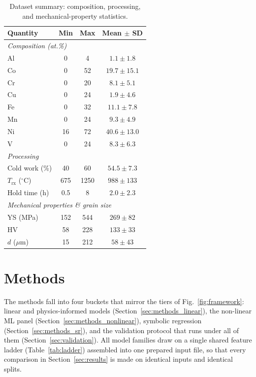 \documentclass[5p,times,twocolumn]{elsarticle}
\begin{document}
\begin{table}[t]
\centering
\caption{Dataset summary: composition, processing, and mechanical-property statistics.}
\label{tab:dataset}
\small
\begin{tabular}{lccc}
\toprule
Quantity & Min & Max & Mean $\pm$ SD \\
\midrule
\multicolumn{4}{l}{\textit{Composition (at.\%)}} \\
Al & 0 & 4 & $1.1 \pm 1.8$ \\
Co & 0 & 52 & $19.7 \pm 15.1$ \\
Cr & 0 & 20 & $8.1 \pm 5.1$ \\
Cu & 0 & 24 & $1.9 \pm 4.6$ \\
Fe & 0 & 32 & $11.1 \pm 7.8$ \\
Mn & 0 & 24 & $9.3 \pm 4.9$ \\
Ni & 16 & 72 & $40.6 \pm 13.0$ \\
V  & 0 & 24 & $8.3 \pm 6.3$ \\
\midrule
\multicolumn{4}{l}{\textit{Processing}} \\
Cold work (\%)              & 40 & 60   & $54.5 \pm 7.3$ \\
$T_\text{rx}$ ($^\circ$C)   & 675 & 1250 & $988 \pm 133$ \\
Hold time (h)               & 0.5 & 8    & $2.0 \pm 2.3$ \\
\midrule
\multicolumn{4}{l}{\textit{Mechanical properties \& grain size}} \\
YS (MPa)        & 152 & 544 & $269 \pm 82$ \\
HV              & 58  & 228 & $133 \pm 33$ \\
$d$ ($\mu$m)    & 15  & 212 & $58 \pm 43$ \\
\bottomrule
\end{tabular}
\end{table}






% 
% 





\section{Methods}
\label{sec:methods}

The methods fall into four buckets that mirror the tiers of Fig.~\ref{fig:framework}: linear and physics-informed models (Section~\ref{sec:methods_linear}), the non-linear ML panel (Section~\ref{sec:methods_nonlinear}), symbolic regression (Section~\ref{sec:methods_sr}), and the validation protocol that runs under all of them (Section~\ref{sec:validation}). All model families draw on a single shared feature ladder (Table~\ref{tab:ladder}) assembled into one prepared input file, so that every comparison in Section~\ref{sec:results} is made on identical inputs and identical splits.
\end{document}
